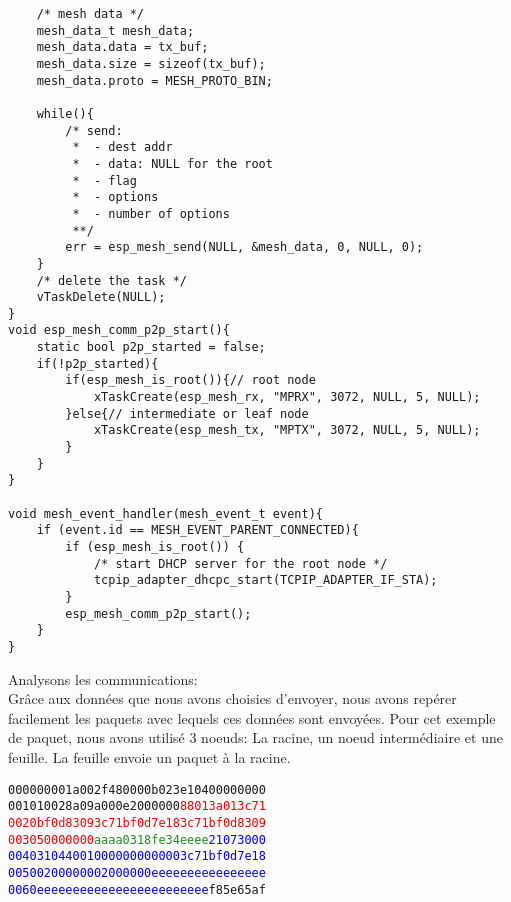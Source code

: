 \begin{enumerate}
\begin{verbatim}
    /* mesh data */
    mesh_data_t mesh_data;
    mesh_data.data = tx_buf;
    mesh_data.size = sizeof(tx_buf);
    mesh_data.proto = MESH_PROTO_BIN;

    while(){
        /* send:
         *  - dest addr
         *  - data: NULL for the root
         *  - flag
         *  - options
         *  - number of options
         **/
        err = esp_mesh_send(NULL, &mesh_data, 0, NULL, 0);
    }
    /* delete the task */
    vTaskDelete(NULL);
}
void esp_mesh_comm_p2p_start(){
    static bool p2p_started = false;
    if(!p2p_started){
        if(esp_mesh_is_root()){// root node
            xTaskCreate(esp_mesh_rx, "MPRX", 3072, NULL, 5, NULL);       
        }else{// intermediate or leaf node
            xTaskCreate(esp_mesh_tx, "MPTX", 3072, NULL, 5, NULL);
        }
    }
}

void mesh_event_handler(mesh_event_t event){
    if (event.id == MESH_EVENT_PARENT_CONNECTED){
        if (esp_mesh_is_root()) {
            /* start DHCP server for the root node */
            tcpip_adapter_dhcpc_start(TCPIP_ADAPTER_IF_STA);
        }
        esp_mesh_comm_p2p_start();
    }
}
            \end{verbatim}
            Analysons les communications:\\
            Grâce aux données que nous avons choisies d'envoyer, nous avons repérer facilement
            les paquets avec lequels ces données sont envoyées. Pour cet exemple de paquet,
            nous avons utilisé 3 noeuds: La racine, un noeud intermédiaire et une feuille.
            La feuille envoie un paquet à la racine.
            \begin{alltt}
0000   00 00 1a 00 2f 48 00 00 b0 23 e1 04 00 00 00 00
0010   10 02 8a 09 a0 00 e2 00 00 00 \textcolor{red}{88 01 3a 01 3c 71
0020   bf 0d 83 09 3c 71 bf 0d 7e 18 3c 71 bf 0d 83 09
0030   50 00 00 00} \textcolor{ForestGreen}{aa aa 03 18 fe 34 ee ee} \textcolor{blue}{21 07 30 00
0040   31 04 40 01 00 00 00 00 00 00 3c 71 bf 0d 7e 18
0050   02 00 00 00 02 00 00 00 ee ee ee ee ee ee ee ee
0060   ee ee ee ee ee ee ee ee ee ee ee ee} f8 5e 65 af
                

\end{alltt}
\end{enumerate}
